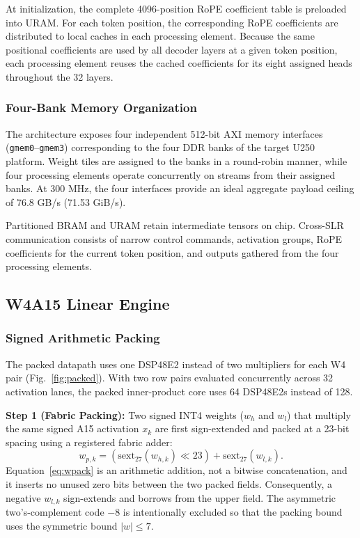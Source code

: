 \documentclass[conference]{IEEEtran}
\begin{document}
At initialization, the complete 4096-position RoPE coefficient table is
preloaded into URAM. For each token
position, the corresponding RoPE coefficients are distributed to local caches
in each processing element. Because the same positional coefficients are
used by all decoder layers at a given token position, each processing element
reuses the cached coefficients for its eight assigned heads throughout the 32
layers.

\subsubsection{Four-Bank Memory Organization}

The architecture exposes four independent 512-bit AXI memory interfaces
(\texttt{gmem0}--\texttt{gmem3}) corresponding to the four DDR banks of the
target U250 platform. Weight tiles are assigned to the banks in a round-robin
manner, while four processing elements operate concurrently on streams from
their assigned banks. At 300 MHz, the four interfaces provide an ideal
aggregate payload ceiling of 76.8 GB/s (71.53 GiB/s).

Partitioned BRAM and URAM retain intermediate tensors on chip. Cross-SLR
communication consists of narrow control commands, activation groups, RoPE
coefficients for the current token position, and outputs gathered from the four
processing elements.

\subsection{W4A15 Linear Engine}

\subsubsection{Signed Arithmetic Packing}

The packed datapath uses one DSP48E2 instead of two multipliers for each W4 pair
(Fig.~\ref{fig:packed}). With two row pairs evaluated concurrently across 32
activation lanes, the packed inner-product core uses 64 DSP48E2s instead of
128.

\textbf{Step 1 (Fabric Packing):}
Two signed INT4 weights ($w_h$ and $w_l$) that multiply the same signed A15
activation $x_k$ are first sign-extended and packed at a 23-bit spacing using
a registered fabric adder:
\begin{equation}
 w_{p,k} =
 \left(\mathrm{sext}_{27}(w_{h,k}) \ll 23\right)
 +\mathrm{sext}_{27}(w_{l,k}).
 \label{eq:wpack}
\end{equation}
Equation~\eqref{eq:wpack} is an arithmetic addition, not a bitwise
concatenation, and it inserts no unused zero bits between the two packed fields.
Consequently, a negative $w_{l,k}$ sign-extends and borrows from the upper
field. The asymmetric two's-complement code $-8$ is intentionally excluded so
that the packing bound uses the symmetric bound $|w|\le 7$.
\end{document}
